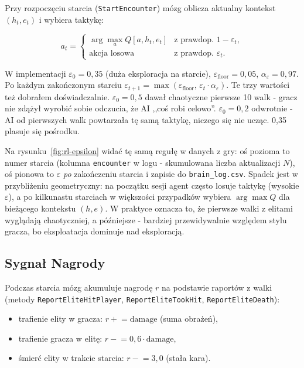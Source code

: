 Przy rozpoczęciu starcia (\texttt{StartEncounter}) mózg oblicza aktualny kontekst $(h_t, e_t)$ i wybiera taktykę:

\[
    a_t = \begin{cases}
        \arg\max_a Q[a, h_t, e_t] & \text{z prawdop.\ } 1-\varepsilon_t, \\
        \text{akcja losowa} & \text{z prawdop.\ } \varepsilon_t.
    \end{cases}
\]

W implementacji $\varepsilon_0 = 0{,}35$ (duża eksploracja na starcie), $\varepsilon_\text{floor} = 0{,}05$, $\alpha_\varepsilon = 0{,}97$. Po każdym zakończonym starciu $\varepsilon_{t+1} = \max(\varepsilon_\text{floor},\, \varepsilon_t \cdot \alpha_\varepsilon)$. Te trzy wartości też dobrałem doświadczalnie. $\varepsilon_0 = 0{,}5$ dawał chaotyczne pierwsze 10 walk - gracz nie zdążył wyrobić sobie odczucia, że AI ,,coś robi celowo''. $\varepsilon_0 = 0{,}2$ odwrotnie - AI od pierwszych walk powtarzała tę samą taktykę, niczego się nie ucząc. 0,35 plasuje się pośrodku.

Na rysunku~\ref{fig:rl-epsilon} widać tę samą regułę w danych z gry: oś pozioma to numer starcia (kolumna \texttt{encounter} w logu - skumulowana liczba aktualizacji $N$), oś pionowa to $\varepsilon$ \emph{po} zakończeniu starcia i zapisie do \texttt{brain\_log.csv}. Spadek jest w przybliżeniu geometryczny: na początku sesji agent często losuje taktykę (wysokie $\varepsilon$), a po kilkunastu starciach w większości przypadków wybiera $\arg\max Q$ dla bieżącego kontekstu $(h,e)$. W praktyce oznacza to, że pierwsze walki z elitami wyglądają chaotyczniej, a późniejsze - bardziej przewidywalnie względem stylu gracza, bo eksploatacja dominuje nad eksploracją.


\subsection{Sygnał Nagrody}

Podczas starcia mózg akumuluje nagrodę $r$ na podstawie raportów z walki (metody \texttt{ReportEliteHitPlayer}, \texttt{ReportEliteTookHit}, \texttt{ReportEliteDeath}):

\begin{itemize}
    \item trafienie elity w gracza: $r \mathrel{+}= \text{damage}$ (suma obrażeń),
    \item trafienie gracza w elitę: $r \mathrel{-}= 0{,}6 \cdot \text{damage}$,
    \item śmierć elity w trakcie starcia: $r \mathrel{-}= 3{,}0$ (stała kara).
\end{itemize}

